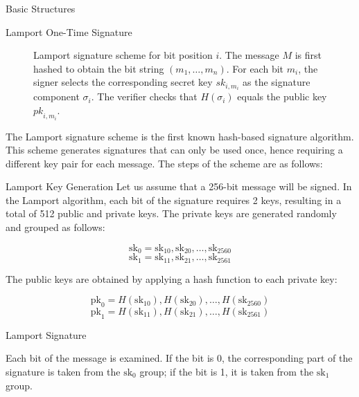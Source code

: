 \documentclass[version=preprint]{iacrcc}
\begin{document}
\begin{section}{Basic Structures}{\label{sec1}}
\begin{subsection}{Lamport One-Time Signature}
\begin{figure}[h]
\caption{Lamport signature scheme for bit position $i$. The message $M$ is first hashed to obtain the bit string $(m_1, \ldots, m_n)$. For each bit $m_i$, the signer selects the corresponding secret key $\mathit{sk}_{i,m_i}$ as the signature component $\sigma_i$. The verifier checks that $H(\sigma_i)$ equals the public key $\mathit{pk}_{i,m_i}$.}
\label{fig:lamport}
\end{figure}
The Lamport signature scheme \cite{lamport1979constructing} is the first known hash-based signature algorithm. This scheme generates signatures that can only be used once, hence requiring a different key pair for each message. The steps of the scheme are as follows:

\begin{subsubsection}{Lamport Key Generation}
    Let us assume that a 256-bit message will be signed. In the Lamport algorithm, each bit of the signature requires 2 keys, resulting in a total of 512 public and private keys. The private keys are generated randomly and grouped as follows:

    \[
    \text{sk}_0 = \text{sk}_{10}, \text{sk}_{20}, \ldots, \text{sk}_{2560}
    \]
    \[
    \text{sk}_1 = \text{sk}_{11}, \text{sk}_{21}, \ldots, \text{sk}_{2561}
    \]
    
    The public keys are obtained by applying a hash function to each private key:
    
    \[
    \text{pk}_0 = H(\text{sk}_{10}), H(\text{sk}_{20}), \ldots, H(\text{sk}_{2560})
    \]
    \[
    \text{pk}_1 = H(\text{sk}_{11}), H(\text{sk}_{21}), \ldots, H(\text{sk}_{2561}) \]
    
\end{subsubsection}

\begin{subsubsection}{Lamport Signature}

    Each bit of the message is examined. If the bit is 0, the corresponding part of the signature is taken from the \(\text{sk}_0\) group; if the bit is 1, it is taken from the \(\text{sk}_1\) group.


\end{subsubsection}
\end{subsection}
\end{section}
\end{document}
